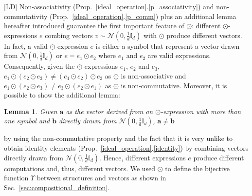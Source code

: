 \documentclass[twoside,11pt]{article}
\newtheorem{lemma}{Lemma}
\def\vec#1{\mathbf{#1}}
\def\svec#1{\vec{#1}}
\def\df{\Upsilon}
\def\mo{\odot}
\def\Mo{\bigodot}
\newcounter{properties}
\def\comment#1#2{}
\def\finalcomment#1#2{}
\def\LD#1{[{\color{blue}L}D] {\color{blue}#1}}
\begin{document}
\LD{Non-associativity (Prop.~\ref{ideal_operation}.\ref{p_associativity}) and non-commutativity (Prop.~\ref{ideal_operation}.\ref{p_comm}) plus an additional lemma hereafter introduced guarantee the first important feature of $\mo$: different $\mo$-expressions $e$ combing vectors $v \sim \mathcal{N}(0,\frac{1}{d}\mathbb{I}_d)$ with $\mo$ produce different vectors.} 
In fact, a valid $\mo$-expression $e$ is either a symbol that represent a vector drawn from $\mathcal{N}(0,\frac{1}{d}\mathbb{I}_d)$ or $e=e_1 \mo e_2$ where $e_1$ and $e_2$ are valid expressions. Consequently, given the $\mo$-expressions $e_1$, $e_2$ and $e_3$, $e_1 \mo (e_2 \mo e_3) \neq (e_1 \mo e_2) \mo e_3$ as $\mo$ is non-associative and $e_1 \mo (e_2 \mo e_3) \neq e_3 \mo (e_2 \mo e_1)$ as $\mo$ is non-commutative.  Moreover,  it is possible to show the additional lemma:
\begin{lemma}
\label{survived_property}
Given $\svec{a}$ as the vector derived from an $\mo$-expression with more than one symbol and $\svec{b}$ directly drawn from $\mathcal{N}(0,\frac{1}{d}\mathbb{I}_d)$, 
$\svec{a} \neq \svec{b}$
\end{lemma}
by using the non-commutative property and the fact that it is very unlike to obtain identity elements (Prop.~\ref{ideal_operation}.\ref{identity}) by combining vectors directly drawn from $\mathcal{N}(0,\frac{1}{d}\mathbb{I}_d)$.
Hence, different expressions $e$ produce different computations and, thus, different vectors. 
We used $\mo$ to define the bijective function $\df$ between structures and vectors as shown in Sec.~\ref{sec:compositional_definition}.


\end{document}
